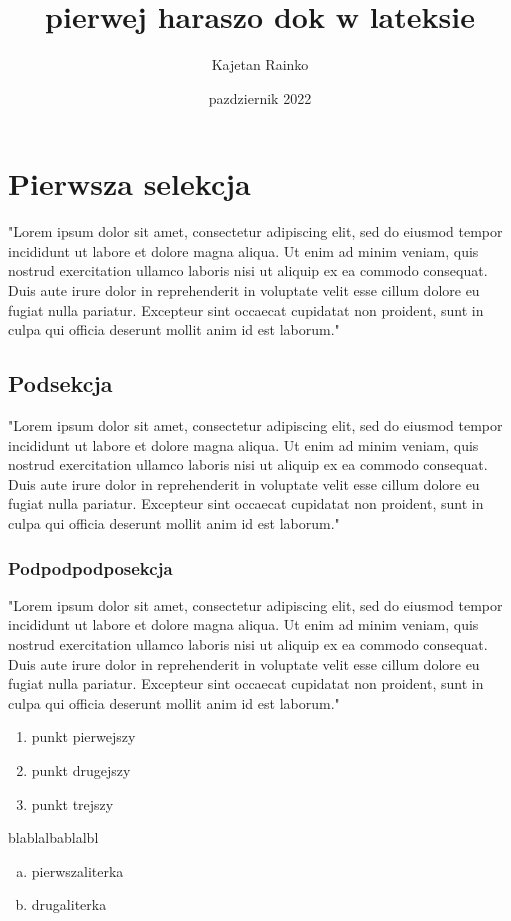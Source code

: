 \documentclass[12pt; a4paper; titlepage]{article}
\title{pierwej haraszo dok w lateksie}
\author{Kajetan Rainko}
\date {pazdziernik 2022}
\begin{document}
\maketitle
\newpage
\section{Pierwsza selekcja}
"Lorem ipsum dolor sit amet, consectetur adipiscing elit, sed do eiusmod tempor incididunt ut labore et dolore magna aliqua. Ut enim ad minim veniam, quis nostrud exercitation ullamco laboris nisi ut aliquip ex ea commodo consequat. Duis aute irure dolor in reprehenderit in voluptate velit esse cillum dolore eu fugiat nulla pariatur. Excepteur sint occaecat cupidatat non proident, sunt in culpa qui officia deserunt mollit anim id est laborum."
\subsection{Podsekcja}
"Lorem ipsum dolor sit amet, consectetur adipiscing elit, sed do eiusmod tempor incididunt ut labore et dolore magna aliqua. Ut enim ad minim veniam, quis nostrud exercitation ullamco laboris nisi ut aliquip ex ea commodo consequat. Duis aute irure dolor in reprehenderit in voluptate velit esse cillum dolore eu fugiat nulla pariatur. Excepteur sint occaecat cupidatat non proident, sunt in culpa qui officia deserunt mollit anim id est laborum."
\subsubsection{Podpodpodposekcja}
"Lorem ipsum dolor sit amet, consectetur adipiscing elit, sed do eiusmod tempor incididunt ut labore et dolore magna aliqua. Ut enim ad minim veniam, quis nostrud exercitation ullamco laboris nisi ut aliquip ex ea commodo consequat. Duis aute irure dolor in reprehenderit in voluptate velit esse cillum dolore eu fugiat nulla pariatur. Excepteur sint occaecat cupidatat non proident, sunt in culpa qui officia deserunt mollit anim id est laborum."
\newpage
\begin{enumerate}
\item punkt pierwejszy
\item punkt drugejszy
\item punkt trejszy
\end{enumerate}
blablalbablalbl
\newline
\begin{enumerate}[a)]
\item pierwszaliterka
\item drugaliterka
\end{enumerate}
\newpage
\end{document}
